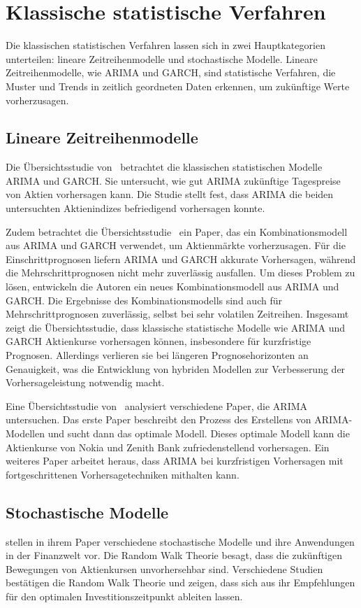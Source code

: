 \section{Klassische statistische Verfahren}\label{sec:klassische_verfahren}
Die klassischen statistischen Verfahren lassen sich in zwei Hauptkategorien unterteilen: lineare Zeitreihenmodelle und stochastische Modelle. Lineare Zeitreihenmodelle, wie \ac{ARIMA} und \ac{GARCH}, sind statistische Verfahren, die Muster und Trends in zeitlich geordneten Daten erkennen, um zukünftige Werte vorherzusagen.
\subsection{Lineare Zeitreihenmodelle}\label{subsec:lineare_zeitreihenmodelle}
Die Übersichtsstudie von~\textcite{rundo2019machine} betrachtet die klassischen statistischen Modelle \ac{ARIMA} und \ac{GARCH}. Sie untersucht, wie gut \ac{ARIMA} zukünftige Tagespreise von Aktien vorhersagen kann. Die Studie stellt fest, dass \ac{ARIMA} die beiden untersuchten Aktienindizes befriedigend vorhersagen konnte.

Zudem betrachtet die Übersichtsstudie~\cite{rundo2019machine} ein Paper, das ein Kombinationsmodell aus \ac{ARIMA} und \ac{GARCH} verwendet, um Aktienmärkte vorherzusagen. Für die Einschrittprognosen liefern \ac{ARIMA} und \ac{GARCH} akkurate Vorhersagen, während die Mehrschrittprognosen nicht mehr zuverlässig ausfallen. Um dieses Problem zu lösen, entwickeln die Autoren ein neues Kombinationsmodell aus \ac{ARIMA} und \ac{GARCH}. Die Ergebnisse des Kombinationsmodells sind auch für Mehrschrittprognosen zuverlässig, selbst bei sehr volatilen Zeitreihen. Insgesamt zeigt die Übersichtsstudie, dass klassische statistische Modelle wie \ac{ARIMA} und \ac{GARCH} Aktienkurse vorhersagen können, insbesondere für kurzfristige Prognosen. Allerdings verlieren sie bei längeren Prognosehorizonten an Genauigkeit, was die Entwicklung von hybriden Modellen zur Verbesserung der Vorhersageleistung notwendig macht.

Eine Übersichtsstudie von~\textcite{shah2019stock} analysiert verschiedene Paper, die \ac{ARIMA} untersuchen. Das erste Paper beschreibt den Prozess des Erstellens von \ac{ARIMA}-Modellen und sucht dann das optimale Modell. Dieses optimale Modell kann die Aktienkurse von Nokia und Zenith Bank zufriedenstellend vorhersagen. Ein weiteres Paper arbeitet heraus, dass \ac{ARIMA} bei kurzfristigen Vorhersagen mit fortgeschrittenen Vorhersagetechniken mithalten kann.
\subsection{Stochastische Modelle}\label{subsec:stochastische_modelle}
\textcite{sasikumar2015applications} stellen in ihrem Paper verschiedene stochastische Modelle und ihre Anwendungen in der Finanzwelt vor. Die Random Walk Theorie besagt, dass die zukünftigen Bewegungen von Aktienkursen unvorhersehbar sind. Verschiedene Studien bestätigen die Random Walk Theorie und zeigen, dass sich aus ihr Empfehlungen für den optimalen Investitionszeitpunkt ableiten lassen.

